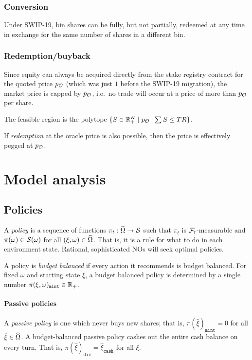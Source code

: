 \subsubsection{Conversion}

Under SWIP-19, bin shares can be fully, but not partially, redeemed at any time in exchange for the same number of shares in a different bin.

\subsubsection{Redemption/buyback}

Since equity can always be acquired directly from the stake registry contract for the quoted price $p_{\mathcal{O}}$ (which was just $1$ before the SWIP-19 migration), the market price is capped by $p_{\mathcal{O}}$, i.e.~no trade will occur at a price of more than $p_{\mathcal{O}}$ per share.

The feasible region is the polytope $\{S\in\mathbb{R}_+^K\mid p_{\mathcal{O}}\cdot\sum S \leq TR\}$.

If \emph{redemption} at the oracle price is also possible, then the price is effectively pegged at $p_{\mathcal{O}}$.


\newpage
\section{Model analysis}
\label{section:analysis}



\subsection{Policies}
\label{section:policies}

A \emph{policy} is a sequence of functions $\pi_t:\widehat{\Omega}\rightarrow\mathcal{S}$ such that $\pi_t$ is $\mathcal{F}_t$-measurable and $\pi(\omega)\in\mathcal{S}(\omega)$ for all $(\xi,\omega)\in\widehat{\Omega}$.
%
That is, it is a rule for what to do in each environment state.
%
Rational, sophisticated NOs will seek optimal policies.

A policy is \emph{budget balanced} if every action it recommends is budget balanced.
%
For fixed $\omega$ and starting state $\xi$, a budget balanced policy is determined by a single number $\pi(\xi,\omega)_\mathtt{mint}\in\mathbb{R}_+$.

\paragraph{Passive policies}
%
A \emph{passive policy} is one which never buys new shares; that is, $\pi(\hat\xi)_\mathtt{mint}=0$ for all $\hat\xi\in\widehat{\Omega}$.
%
A budget-balanced passive policy cashes out the entire cash balance on every turn. 
%
That is, $\pi(\hat\xi)_\mathtt{div}=\hat\xi_\mathtt{cash}$ for all $\xi$.

